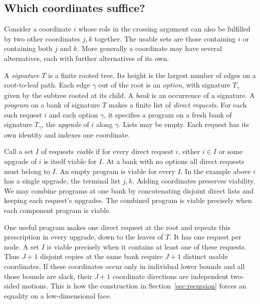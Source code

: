 \subsection{Which coordinates suffice?}

Consider a coordinate \(i\) whose role in the crossing argument can also be
fulfilled by two other coordinates \(j,k\) together. The usable sets
are those containing \(i\) or containing both \(j\) and \(k\). More
generally a coordinate may have several alternatives, each with further
alternatives of its own.

A \emph{signature} \(T\) is a finite rooted tree. Its height is the largest
number of edges on a root-to-leaf path. Each edge \(\gamma\) out of the
root is an \emph{option}, with signature \(T_\gamma\) given by the subtree
rooted at its child. A \emph{bank} is an occurrence of a signature. A
\emph{program} on a bank of signature \(T\) makes a finite list of
\emph{direct requests}. For each such request \(i\) and each option
\(\gamma\), it specifies a program on a fresh bank of signature
\(T_\gamma\), the \emph{upgrade} of \(i\) along \(\gamma\). Lists may be
empty. Each request has its own identity and indexes one coordinate.

Call a set \(I\) of requests \emph{viable} if for every direct request
\(i\), either \(i\in I\) or some upgrade of \(i\) is itself viable for
\(I\). At a bank with no options all direct requests must belong to \(I\).
An empty program is viable for every \(I\). In the example above \(i\) has a
single upgrade, the terminal list \(j,k\). Adding coordinates preserves
viability. We may combine programs at one bank by concatenating disjoint
direct lists and keeping each request's upgrades. The combined program
is viable precisely when each component program is viable.

One useful program makes one direct request at the root and repeats this
prescription in every upgrade, down to the leaves of \(T\). It has one
request per node. A set \(I\) is viable precisely when it contains at
least one of these requests. Thus \(J+1\) disjoint copies at the same
bank require \(J+1\) distinct usable coordinates. If these coordinates
occur only in individual lower bounds and all those bounds are slack,
their \(J+1\) coordinate directions are independent two-sided motions.
This is how the construction in Section~\ref{sec:recursion} forces an
equality on a low-dimensional face.

